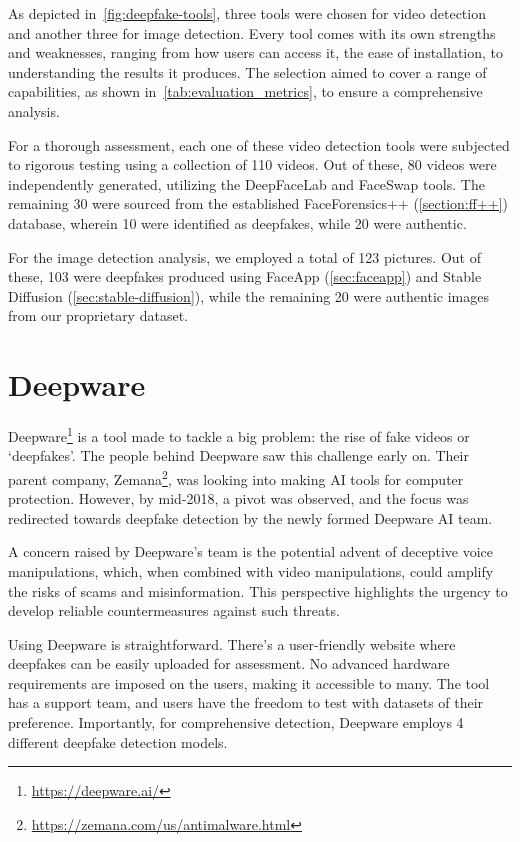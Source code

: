 As depicted in~\autoref{fig:deepfake-tools}, three tools were chosen for video
detection and another three for image detection. Every tool comes with its own
strengths and weaknesses, ranging from how users can access it, the ease of
installation, to understanding the results it produces. The selection aimed to
cover a range of capabilities, as shown in~\autoref{tab:evaluation_metrics},
to ensure a comprehensive analysis.

For a thorough assessment, each one of these video detection tools were subjected
to rigorous testing using a collection of 110 videos. Out of these, 80 videos were independently
generated, utilizing the DeepFaceLab and FaceSwap tools. The remaining 30
were sourced from the established FaceForensics++ (\autoref{section:ff++})
database, wherein 10 were identified as deepfakes, while 20 were authentic.

For the image detection analysis, we employed a total of 123 pictures. Out of
these, 103 were deepfakes produced using FaceApp (\autoref{sec:faceapp}) and
Stable Diffusion (\autoref{sec:stable-diffusion}), while the
remaining 20 were authentic images from our proprietary dataset.

\section{Deepware}\label{sec:deepware}
Deepware\footnote{\url{https://deepware.ai/}} is a tool made to tackle a big
problem: the rise of fake videos or `deepfakes'. The people behind
Deepware saw this challenge early on. Their parent company,
Zemana\footnote{\url{https://zemana.com/us/antimalware.html}},
was looking into making \ac{AI} tools for computer protection. However,
by mid-2018, a pivot was observed, and the focus was redirected towards
deepfake detection by the newly formed Deepware \ac{AI} team.

A concern raised by Deepware's team is the potential advent of deceptive
voice manipulations, which, when combined with video manipulations, could
amplify the risks of scams and misinformation. This perspective highlights
the urgency to develop reliable countermeasures against such threats.

Using Deepware is straightforward. There's a user-friendly website where
deepfakes can be easily uploaded for assessment. No advanced hardware
requirements are imposed on the users, making it accessible to many.
The tool has a support team, and users have the freedom to test with
datasets of their preference. Importantly, for comprehensive detection,
Deepware employs 4 different deepfake detection models.

